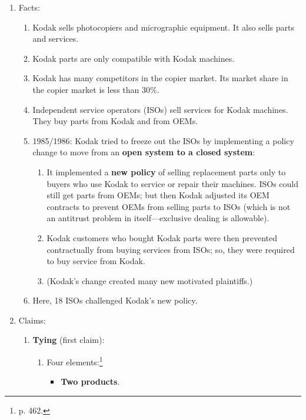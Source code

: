 \begin{enumerate}
    \item Facts:
    \begin{enumerate}
        \item Kodak sells photocopiers and micrographic equipment. It also 
        sells parts and services.
        \item Kodak parts are only compatible with Kodak machines.
        \item Kodak has many competitors in the copier market. Its market 
        share in the copier market is less than 30\%.
        \item Independent service operators (ISOs) sell services for Kodak 
        machines. They buy parts from Kodak and from OEMs.
        \item 1985/1986: Kodak tried to freeze out the ISOs by implementing a 
        policy change to move from an \textbf{open system to a closed system}:
        \begin{enumerate}
            \item It implemented a \textbf{new policy} of selling replacement 
            parts only to buyers who use Kodak to service or repair their 
            machines.  ISOs could still get parts from OEMs; but then Kodak 
            adjusted its OEM contracts to prevent OEMs from selling parts to 
            ISOs (which is not an antitrust problem in itself---exclusive 
            dealing is allowable).
            \item Kodak customers who bought Kodak parts were then prevented 
            contractually from buying services from ISOs; so, they were 
            required to buy service from Kodak.
            \item (Kodak's change created many new motivated plaintiffs.)
        \end{enumerate}
        \item Here, 18 ISOs challenged Kodak's new policy.
    \end{enumerate}
    \item Claims:
    \begin{enumerate}
        \item \textbf{Tying} (first claim):
        \label{kodak-tying-claim}
        \begin{enumerate}
            \item Four elements:\footnote{p. 462.}
            \begin{itemize}
                \item \textbf{Two products}.

\end{itemize}
\end{enumerate}
\end{enumerate}
\end{enumerate}

